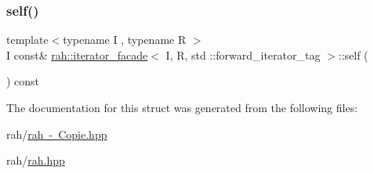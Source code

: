 \mbox{\label{structrah_1_1iterator__facade_3_01_i_00_01_r_00_01std_01_1_1forward__iterator__tag_01_4_addc54ad790aa07a1467e3e4a50d60864}} 
\subsubsection{\texorpdfstring{self()}{self()}\hspace{0.1cm}{\footnotesize\ttfamily [4/4]}}
{\footnotesize\ttfamily template$<$typename I , typename R $>$ \\
I const\& \mbox{\hyperlink{structrah_1_1iterator__facade}{rah\+::iterator\+\_\+facade}}$<$ I, R, std \+::forward\+\_\+iterator\+\_\+tag $>$\+::self (\begin{DoxyParamCaption}{ }\end{DoxyParamCaption}) const\hspace{0.3cm}{\ttfamily [inline]}}



The documentation for this struct was generated from the following files\+:\begin{DoxyCompactItemize}
\item 
rah/\mbox{\hyperlink{rah_01-_01_copie_8hpp}{rah -\/ Copie.\+hpp}}\item 
rah/\mbox{\hyperlink{rah_8hpp}{rah.\+hpp}}\end{DoxyCompactItemize}
